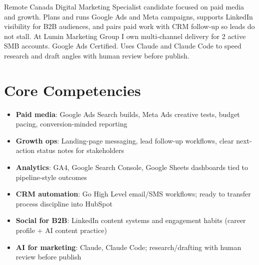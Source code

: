 \documentclass[11pt,a4paper,sans]{moderncv}
\begin{document}
\makecvtitle

\vspace{6pt}
\small{Remote Canada Digital Marketing Specialist candidate focused on paid media and growth. Plans and runs Google Ads and Meta campaigns, supports LinkedIn visibility for B2B audiences, and pairs paid work with CRM follow-up so leads do not stall. At Lumin Marketing Group I own multi-channel delivery for 2 active SMB accounts. Google Ads Certified. Uses Claude and Claude Code to speed research and draft angles with human review before publish.}

\section{Core Competencies}
\vspace{1pt}
\begin{itemize}
\item \textbf{Paid media}: Google Ads Search builds, Meta Ads creative tests, budget pacing, conversion-minded reporting
\item \textbf{Growth ops}: Landing-page messaging, lead follow-up workflows, clear next-action status notes for stakeholders
\item \textbf{Analytics}: GA4, Google Search Console, Google Sheets dashboards tied to pipeline-style outcomes
\item \textbf{CRM automation}: Go High Level email/SMS workflows; ready to transfer process discipline into HubSpot
\item \textbf{Social for B2B}: LinkedIn content systems and engagement habits (career profile + AI content practice)
\item \textbf{AI for marketing}: Claude, Claude Code; research/drafting with human review before publish
\end{itemize}
\end{document}
